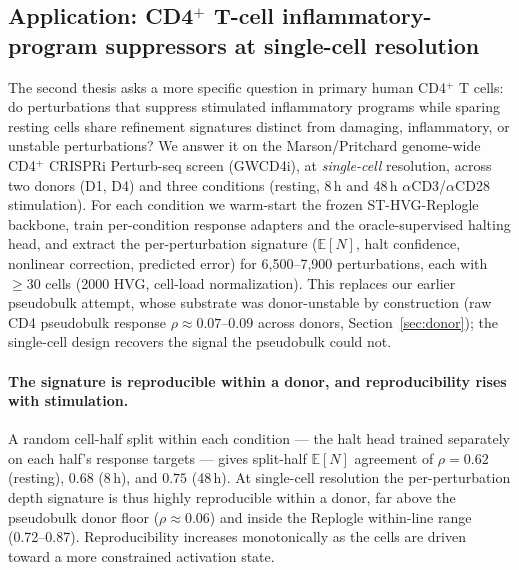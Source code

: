 \documentclass[11pt]{article}
\newcommand{\EN}{\ensuremath{\mathbb{E}[N]}}
\let\mathrho\rho
\renewcommand{\rho}{\ensuremath{\mathrho}}
\begin{document}
\subsection{Application: CD4$^+$ T-cell inflammatory-program suppressors at single-cell resolution}
\label{sec:cd4}

The second thesis asks a more specific question in primary human CD4$^+$ T cells: do perturbations
that suppress stimulated inflammatory programs while sparing resting cells share refinement
signatures distinct from damaging, inflammatory, or unstable perturbations? We answer it on the
Marson/Pritchard genome-wide CD4$^+$ CRISPRi Perturb-seq screen (GWCD4i), at \emph{single-cell}
resolution, across two donors (D1, D4) and three conditions (resting, 8\,h and 48\,h
$\alpha$CD3/$\alpha$CD28 stimulation). For each condition we warm-start the frozen
ST-HVG-Replogle backbone, train per-condition response adapters and the oracle-supervised halting
head, and extract the per-perturbation signature (\EN{}, halt confidence, nonlinear correction,
predicted error) for 6{,}500--7{,}900 perturbations, each with $\geq30$ cells (2000 HVG, cell-load
normalization). This replaces our earlier pseudobulk attempt, whose substrate was donor-unstable
by construction (raw CD4 pseudobulk response \rho{}$\approx0.07$--0.09 across donors,
Section~\ref{sec:donor}); the single-cell design recovers the signal the pseudobulk could not.

\paragraph{The signature is reproducible within a donor, and reproducibility rises with
stimulation.} A random cell-half split within each condition --- the halt head trained separately
on each half's response targets --- gives split-half \EN{} agreement of \rho{}$=0.62$ (resting),
$0.68$ (8\,h), and $0.75$ (48\,h). At single-cell resolution the per-perturbation depth signature
is thus highly reproducible within a donor, far above the pseudobulk donor floor
(\rho{}$\approx0.06$) and inside the Replogle within-line range (0.72--0.87). Reproducibility
increases monotonically as the cells are driven toward a more constrained activation state.
\end{document}
